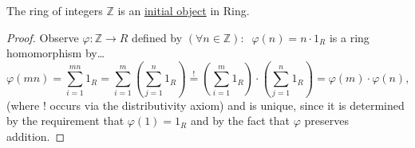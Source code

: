 \begin{proposition}
The ring of integers $\mathbb{Z}$ is an \hyperref[final]{initial object} in Ring.
\end{proposition}

\begin{proof}
Observe $\varphi : \mathbb{Z} \rightarrow R$ defined by $(\forall n \in \mathbb{Z}): \; \; \varphi(n) = n \cdot 1_R$ is a
ring homomorphism by\dots
$$\varphi(mn) = \sum^{mn}_{i=1} 1_R = \sum^{m}_{i=1}(\sum^{n}_{j=1} 1_R) \overset{!}{=} (\sum^{m}_{i=1} 1_R) \cdot (\sum^{n}_{j=1} 1_R) = \varphi(m) \cdot \varphi(n),$$
(where $!$ occurs via the distributivity axiom) and is unique, since it is determined by the requirement that $\varphi(1) = 1_R$ and by the fact that $\varphi$ preserves addition. 
\end{proof}